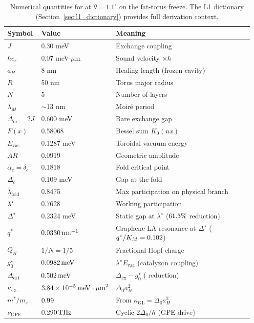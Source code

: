 \documentclass[11pt,letterpaper]{article}
\begin{document}
\begin{table}[htbp]
\centering
\caption{Numerical quantities for \MATBG{} at $\theta = 1.1^\circ$ on the fat-torus freeze. The L1 dictionary (Section~\ref{sec:l1_dictionary}) provides full derivation context.}
\begin{tabular}{lll}
\hline
\textbf{Symbol} & \textbf{Value} & \textbf{Meaning} \\
\hline
$J$ & 0.30 meV & Exchange coupling \\
$\hbar c_s$ & 0.07 meV$\cdot\mu$m & Sound velocity $\times \hbar$ \\
$a_H$ & 8 nm & Healing length (frozen cavity) \\
$R$ & 50 nm & Torus major radius \\
$N$ & 5 & Number of layers \\
$\lambda_M$ & $\sim$13 nm & Moir\'e period \\
$\Delta_{\text{ex}} = 2J$ & 0.600 meV & Bare exchange gap \\
$F(x)$ & 0.58068 & Bessel sum $K_0(nx)$ \\
$E_{\mathrm{vac}}$ & 0.1287 meV & Toroidal vacuum energy \\
$AR$ & 0.0919 & Geometric amplitude \\
$\alpha_c=\delta_c$ & 0.1818 & Fold critical point \\
$\Delta_c$ & 0.109 meV & Gap at the fold \\
$\lambda_{\mathrm{fold}}$ & 0.8475 & Max participation on physical branch \\
$\lambda^\star$ & 0.7628 & Working participation \\
$\Delta^\star$ & 0.2324 meV & Static gap at $\lambda^\star$ ($61.3\%$ reduction) \\
$q^*$ & $0.0330\,\mathrm{nm}^{-1}$ & Graphene-LA resonance at $\Delta^\star$ ($q^*/K_M=0.102$) \\
$Q_H$ & $1/N = 1/5$ & Fractional Hopf charge \\
$g_0^\star$ & $0.0982\,\mathrm{meV}$ & $\lambda^\star E_{\mathrm{vac}}$ (catalyzon coupling) \\
$\Delta_{\mathrm{cat}}$ & $0.502\,\mathrm{meV}$ & $\Delta_{\mathrm{ex}}-g_0^\star$ (\pctcat{} reduction) \\
$\kappa_{\mathrm{GL}}$ & $3.84\times 10^{-5}\,\mathrm{meV\cdot\mu m}^{2}$ & $\Delta_0 a_H^2$ \\
$m^*/m_e$ & $0.99$ & From $\kappa_{\mathrm{GL}}=\Delta_0 a_H^2$ \\
$\nu_{\mathrm{GPE}}$ & $0.290\,\mathrm{THz}$ & Cyclic $2\Delta_0/h$ (GPE drive) \\

\end{tabular}
\end{table}
\end{document}
